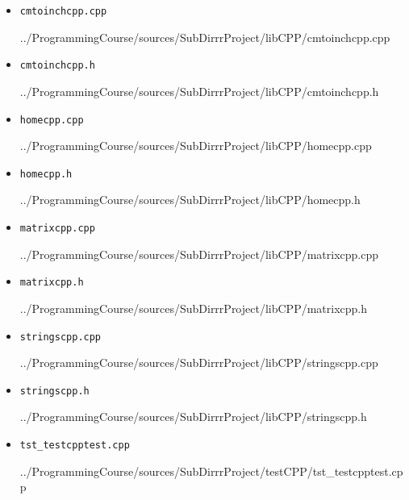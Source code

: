 \documentclass[12pt,a4paper]{report}
\begin{document}
\begin{itemize}
\item[] \verb-cmtoinchcpp.cpp-

{../ProgrammingCourse/sources/SubDirrrProject/libCPP/cmtoinchcpp.cpp}

\item[] \verb-cmtoinchcpp.h-

{../ProgrammingCourse/sources/SubDirrrProject/libCPP/cmtoinchcpp.h}

\item[] \verb-homecpp.cpp-

{../ProgrammingCourse/sources/SubDirrrProject/libCPP/homecpp.cpp}

\item[] \verb-homecpp.h-

{../ProgrammingCourse/sources/SubDirrrProject/libCPP/homecpp.h}

\item[] \verb-matrixcpp.cpp-

{../ProgrammingCourse/sources/SubDirrrProject/libCPP/matrixcpp.cpp}

\item[] \verb-matrixcpp.h-

{../ProgrammingCourse/sources/SubDirrrProject/libCPP/matrixcpp.h}

\item[] \verb-stringscpp.cpp-

{../ProgrammingCourse/sources/SubDirrrProject/libCPP/stringscpp.cpp}

\item[] \verb-stringscpp.h-

{../ProgrammingCourse/sources/SubDirrrProject/libCPP/stringscpp.h}

\item[] \verb-tst_testcpptest.cpp-

{../ProgrammingCourse/sources/SubDirrrProject/testCPP/tst_testcpptest.cpp}

\end{itemize}
\end{document}

